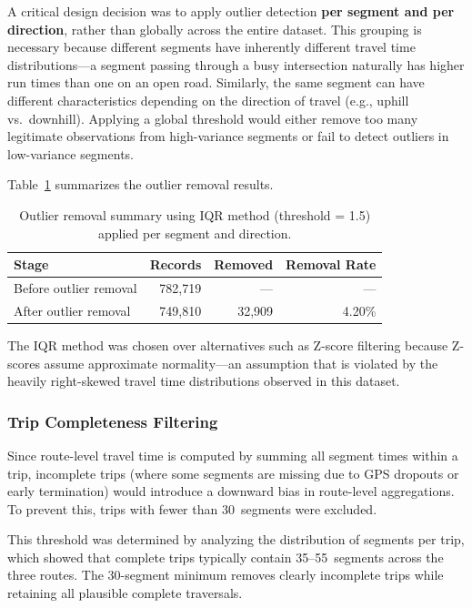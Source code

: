 A critical design decision was to apply outlier detection \textbf{per segment and per direction}, rather than globally across the entire dataset. This grouping is necessary because different segments have inherently different travel time distributions—a segment passing through a busy intersection naturally has higher run times than one on an open road. Similarly, the same segment can have different characteristics depending on the direction of travel (e.g., uphill vs.\ downhill). Applying a global threshold would either remove too many legitimate observations from high-variance segments or fail to detect outliers in low-variance segments.

Table~\ref{tab:outlier_removal} summarizes the outlier removal results.

\begin{table}[htbp]
\centering
\caption{Outlier removal summary using IQR method (threshold = 1.5) applied per segment and direction.}
\label{tab:outlier_removal}
\begin{tabular}{lrrr}
\toprule
\textbf{Stage} & \textbf{Records} & \textbf{Removed} & \textbf{Removal Rate} \\
\midrule
Before outlier removal & 782,719 & — & — \\
After outlier removal & 749,810 & 32,909 & 4.20\% \\
\bottomrule
\end{tabular}
\end{table}

The IQR method was chosen over alternatives such as Z-score filtering because Z-scores assume approximate normality—an assumption that is violated by the heavily right-skewed travel time distributions observed in this dataset.

\subsubsection{Trip Completeness Filtering}
\label{subsubsec:trip_completeness}

Since route-level travel time is computed by summing all segment times within a trip, incomplete trips (where some segments are missing due to GPS dropouts or early termination) would introduce a downward bias in route-level aggregations. To prevent this, trips with fewer than 30~segments were excluded.

This threshold was determined by analyzing the distribution of segments per trip, which showed that complete trips typically contain 35--55~segments across the three routes. The 30-segment minimum removes clearly incomplete trips while retaining all plausible complete traversals.

